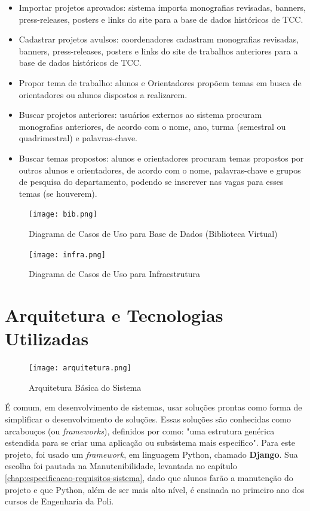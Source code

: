\begin{itemize}
    \item Importar projetos aprovados: sistema importa monografias revisadas, banners, press-releases, posters e links do site para a base de dados históricos de TCC.
    \item Cadastrar projetos avulsos: coordenadores cadastram monografias revisadas, banners, press-releases, posters e links do site de trabalhos anteriores para a base de dados históricos de TCC.
    \item Propor tema de trabalho: alunos e Orientadores propõem temas em busca de orientadores ou alunos dispostos a realizarem.
    \item Buscar projetos anteriores: usuários externos ao sistema procuram monografias anteriores, de acordo com o nome, ano, turma (semestral ou quadrimestral) e palavras-chave.
    \item Buscar temas propostos: alunos e orientadores procuram temas propostos por outros alunos e orientadores, de acordo com o nome, palavras-chave e grupos de pesquisa do departamento, podendo se inscrever nas vagas para esses temas (se houverem).
\end{itemize}

\begin{figure}[H]
    \centering
    \texttt{[image: bib.png]}
    \caption{Diagrama de Casos de Uso para Base de Dados (Biblioteca Virtual)}
    \label{fig:use-case-bib}
\end{figure}

\begin{figure}[H]
    \centering
    \texttt{[image: infra.png]}
    \caption{Diagrama de Casos de Uso para Infraestrutura}
    \label{fig:use-case-infra}
\end{figure}

\section{Arquitetura e Tecnologias Utilizadas}

\begin{figure}[H]
    \centering
    \texttt{[image: arquitetura.png]}
    \caption{Arquitetura Básica do Sistema}
    \label{fig:arch}
\end{figure}

É comum, em desenvolvimento de sistemas, usar soluções prontas como forma de simplificar o desenvolvimento de soluções. Essas soluções são conhecidas como arcabouços (ou \textit{frameworks}), definidos por \citeauthor{iansommerville2011} como: "uma estrutura genérica estendida para se criar uma aplicação ou subsistema mais específico". Para este projeto, foi usado um \textit{framework}, em linguagem Python, chamado \textbf{Django}. Sua escolha foi pautada na Manutenibilidade, levantada no capítulo \ref{chap:especificacao-requisitos-sistema}, dado que alunos farão a manutenção do projeto e que Python, além de ser mais alto nível, é ensinada no primeiro ano dos cursos de Engenharia da Poli.

